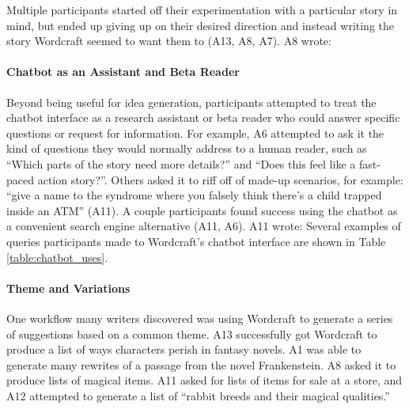 Multiple participants started off their experimentation with a particular story in mind, but ended up giving up on their desired direction and instead writing the story Wordcraft seemed to want them to (A13, A8, A7).
A8 wrote: 

\paragraph{Chatbot as an Assistant and Beta Reader}
Beyond being useful for idea generation, participants attempted to treat the chatbot interface as a research assistant or beta reader who could answer specific questions or request for information.
For example, A6 attempted to ask it the kind of questions they would normally address to a human reader, such as ``Which parts of the story need more details?'' and ``Does this feel like a fast-paced action story?''.
Others asked it to riff off of made-up scenarios, for example: ``give a name to the syndrome where you falsely think there’s a child trapped inside an ATM'' (A11).
A couple participants found success using the chatbot as a convenient search engine alternative (A11, A6).
A11 wrote: 
Several examples of queries participants made to Wordcraft's chatbot interface are shown in Table \ref{table:chatbot_uses}.

\paragraph{Theme and Variations}
One workflow many writers discovered was using Wordcraft to generate a series of suggestions based on a common theme.
A13 successfully got Wordcraft to produce a list of ways characters perish in fantasy novels.
A1 was able to generate many rewrites of a passage from the novel Frankenstein.
A8 asked it to produce lists of magical items.
A11 asked for lists of items for sale at a store, and A12 attempted to generate a list of ``rabbit breeds and their magical qualities.''

